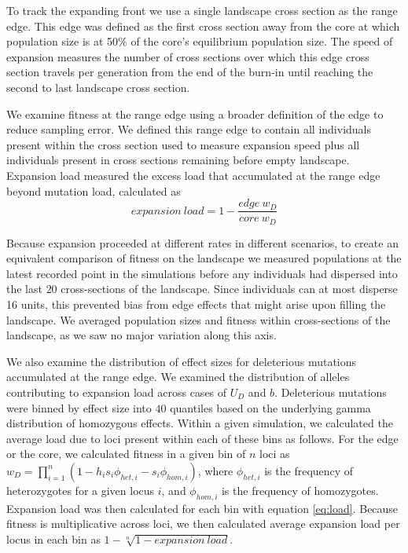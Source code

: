 To track the expanding front we use a single landscape cross section as the range edge. This edge was defined as the first cross section away from the core at which population size is at 50\% of the core's equilibrium population size. The speed of expansion measures the number of cross sections over which this edge cross section travels per generation from the end of the burn-in until reaching the second to last landscape cross section.

We examine fitness at the range edge using a broader definition of the edge to reduce sampling error. We defined this range edge to contain all individuals present within the cross section used to measure expansion speed plus all individuals present in cross sections remaining before empty landscape. Expansion load measured the excess load that accumulated at the range edge beyond mutation load, calculated as 
\begin{equation}
\label{eq:load}
expansion~load = 1 - \frac{edge ~ w_D}{core ~ w_D}
\end{equation}

Because expansion proceeded at different rates in different scenarios, to create an equivalent comparison of fitness on the landscape we measured populations at the latest recorded point in the simulations before any individuals had dispersed into the last $20$ cross-sections of the landscape. Since individuals can at most disperse 16 units, this prevented bias from edge effects that might arise upon filling the landscape. We averaged population sizes and fitness within cross-sections of the landscape, as we saw no major variation along this axis.

We also examine the distribution of effect sizes for deleterious mutations accumulated at the range edge. We examined the distribution of alleles contributing to expansion load across cases of $U_D$ and $b$. Deleterious mutations were binned by effect size into $40$ quantiles based on the underlying gamma distribution of homozygous effects. Within a given simulation, we calculated the average load due to loci present within each of these bins as follows. For the edge or the core, we calculated fitness in a given bin  of $n$ loci as $w_D =  \prod_{i=1}^{n} (1 - h_i s_i \phi_{het,i} - s_i \phi_{hom,i})$, where $\phi_{het,i}$ is the frequency of heterozygotes for a given locus $i$, and $\phi_{hom,i}$ is the frequency of homozygotes. Expansion load was then calculated for each bin with equation \ref{eq:load}. Because fitness is multiplicative across loci, we then calculated average expansion load per locus in each bin as $1 - \sqrt[n]{1 - expansion~load}$.

